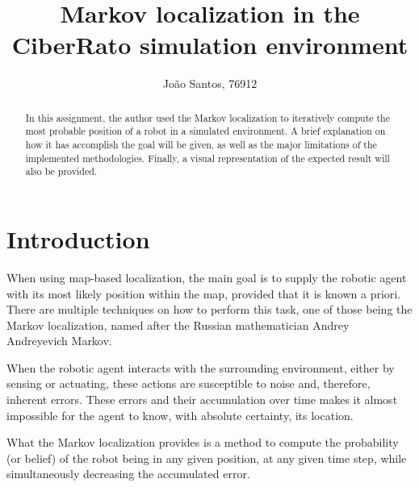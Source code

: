 \documentclass[runningheads]{llncs}
\begin{document}
%
\title{Markov localization in the CiberRato simulation environment 
}
%
%
\author{João Santos, 76912}
%
%
%
\maketitle              %
%
\begin{abstract}
In this assignment, the author used the Markov localization to iteratively compute the most probable position of a robot in a simulated environment. A brief explanation on how it has accomplish the goal will be given, as well as the major limitations of the implemented methodologies. Finally, a visual representation of the expected result will also be provided.

\end{abstract}
%
%
\section{Introduction}
\label{sec:introduction}

When using map-based localization, the main goal is to supply the robotic agent with its most likely position within the map, provided that it is known a priori. There are multiple techniques on how to perform this task, one of those being the Markov localization, named after the Russian mathematician Andrey Andreyevich Markov. 

When the robotic agent interacts with the surrounding environment, either by sensing or actuating, these actions are susceptible to noise and, therefore, inherent errors. These errors and their accumulation over time makes it almost impossible for the agent to know, with absolute certainty, its location.

What the Markov localization provides is a method to compute the probability (or belief) of the robot being in any given position, at any given time step, while simultaneously decreasing the accumulated error. 
\end{document}

